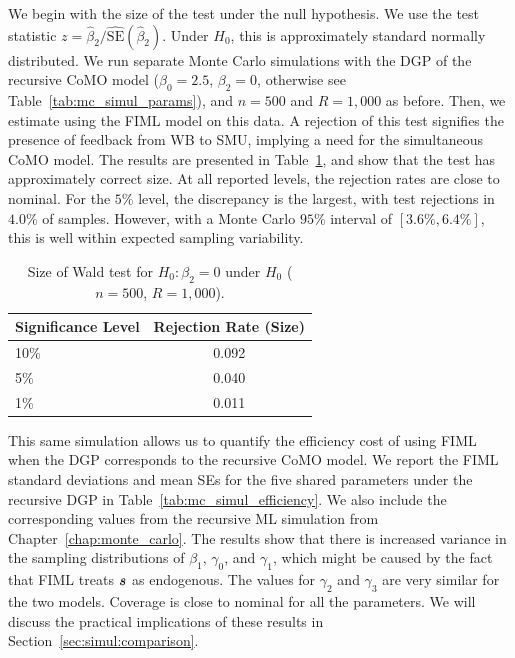 We begin with the size of the test under the null hypothesis. We use the test statistic $z = \hat{\beta}_2 / \widehat{\text{SE}}(\hat\beta_2)$. Under $H_0$, this is approximately standard normally distributed. We run separate Monte Carlo simulations with the DGP of the recursive CoMO model ($\beta_0 = 2.5$, $\beta_2 = 0$, otherwise see Table~\ref{tab:mc_simul_params}), and $n = 500$ and $R = 1{,}000$ as before. Then, we estimate using the FIML model on this data. A rejection of this test signifies the presence of feedback from WB to SMU, implying a need for the simultaneous CoMO model. The results are presented in Table~\ref{tab:mc_wald_size}, and show that the test has approximately correct size. At all reported levels, the rejection rates are close to nominal. For the $5\%$ level, the discrepancy is the largest, with test rejections in $4.0\%$ of samples. However, with a Monte Carlo $95\%$ interval of $[3.6\%, 6.4\%]$, this is well within expected sampling variability.

\begin{table}[htbp]
\centering
\caption[Size of Wald test for $H_0: \beta_2 = 0$]{Size of Wald test for $H_0: \beta_2 = 0$ under $H_0$ ($n = 500$, $R = 1{,}000$).}
\label{tab:mc_wald_size}
\begin{tabular}{lc}
\toprule
Significance Level & Rejection Rate (Size) \\
\midrule
10\% & 0.092 \\
5\% & 0.040 \\
1\% & 0.011 \\
\bottomrule
\end{tabular}
\end{table}

This same simulation allows us to quantify the efficiency cost of using FIML when the DGP corresponds to the recursive CoMO model. We report the FIML standard deviations and mean SEs for the five shared parameters under the recursive DGP in Table~\ref{tab:mc_simul_efficiency}. We also include the corresponding values from the recursive ML simulation from Chapter~\ref{chap:monte_carlo}. The results show that there is increased variance in the sampling distributions of $\beta_1$, $\gamma_0$, and $\gamma_1$, which might be caused by the fact that FIML treats $\bm{s}$ as endogenous. The values for $\gamma_2$ and $\gamma_3$ are very similar for the two models. Coverage is close to nominal for all the parameters. We will discuss the practical implications of these results in Section~\ref{sec:simul:comparison}.

